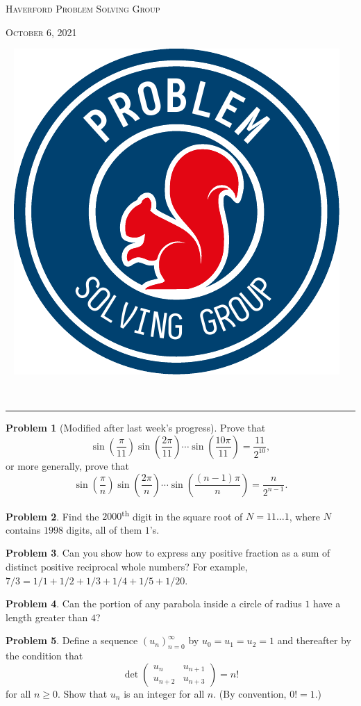 \documentclass{scrartcl}
\theoremstyle{definition}
\newtheorem{prob}{Problem}
\begin{document}
	\begin{minipage}{.6\textwidth}{}
		\textsc{Haverford Problem Solving Group}

		\textsc{October 6, 2021}
	\end{minipage}
	\begin{minipage}{.4\textwidth}{}
		\ \hfill
		\includegraphics[height = .9in]{psg_logo}
	\end{minipage}\\[1em]

	\hrule

	\setcounter{prob}{1}
	\begin{prob}[Modified after last week's progress]
		Prove that \[ \sin\left(\frac{\pi}{11}\right) \sin\left(\frac{2\pi}{11}\right) \cdots \sin\left(\frac{10\pi}{11}\right) = \frac{11}{2^{10}},\]
		or more generally, prove that \[ \sin\left(\frac{\pi}{n}\right) \sin\left(\frac{2\pi}{n}\right) \cdots \sin\left(\frac{(n-1)\pi}{n}\right) = \frac{n}{2^{n-1}}.\]
	\end{prob}

	\begin{prob}
		Find the $2000$\textsuperscript{th} digit in the square root of $N = 11\dots1$, where $N$ contains $1998$ digits, all of them $1$'s.
	\end{prob}

	\setcounter{prob}{4}
	\begin{prob}
		Can you show how to express any positive fraction as a sum of distinct positive reciprocal whole numbers? For example, $7/3 = 1/1 + 1/2 + 1/3 + 1/4 + 1/5 + 1/20$.
	\end{prob}

	\begin{prob}
		Can the portion of any parabola inside a circle of radius \(1\) have a length greater than \(4\)?
	\end{prob}

	\setcounter{prob}{7}
	\begin{prob}%
		Define a sequence \((u_n)_{n=0}^\infty\) by  \(u_0 = u_1 = u_2 = 1\) and thereafter by the condition that  \[
			\det
			\begin{pmatrix}
				u_n & u_{n+1} \\
				u_{n+2} & u_{n+3}
			\end{pmatrix} = n!
		\] for all \(n \geq 0\). Show that \(u_n\) is an integer for all \(n\). 
		(By convention, \(0! = 1\).)
	\end{prob}
\end{document}
